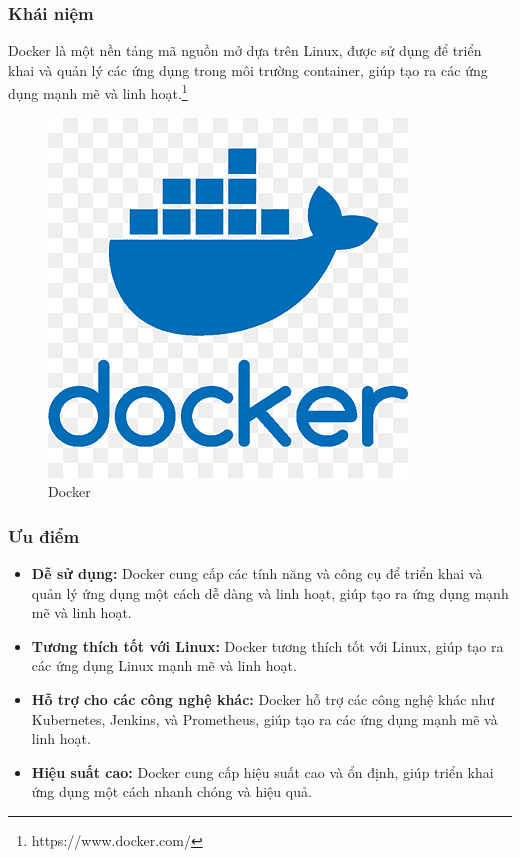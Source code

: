 \subsubsection{Khái niệm}
\noindent Docker là một nền tảng mã nguồn mở dựa trên Linux, được sử dụng để triển khai và quản lý các ứng dụng trong môi trường container, giúp tạo ra các ứng dụng mạnh mẽ và linh hoạt.\footnote{https://www.docker.com/}
\begin{figure}[H]
  \begin{center}
    \includegraphics[scale=0.35]{images/hieu/phuluc/docker.png}
    \caption{Docker}
  \end{center}
\end{figure}
\subsubsection{Ưu điểm}
\begin{itemize}
  \item \textbf{Dễ sử dụng:} Docker cung cấp các tính năng và công cụ để triển khai và quản lý ứng dụng một cách dễ dàng và linh hoạt, giúp tạo ra ứng dụng mạnh mẽ và linh hoạt.
  \item \textbf{Tương thích tốt với Linux:} Docker tương thích tốt với Linux, giúp tạo ra các ứng dụng Linux mạnh mẽ và linh hoạt.
  \item \textbf{Hỗ trợ cho các công nghệ khác:} Docker hỗ trợ các công nghệ khác như Kubernetes, Jenkins, và Prometheus, giúp tạo ra các ứng dụng mạnh mẽ và linh hoạt.
  \item \textbf{Hiệu suất cao:} Docker cung cấp hiệu suất cao và ổn định, giúp triển khai ứng dụng một cách nhanh chóng và hiệu quả.
\end{itemize}

